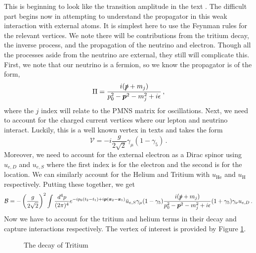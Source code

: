 \documentclass[10pt]{article}
\begin{document}
This is beginning to look like the transition amplitude in the text \cite{Akhmedov_2008}. The difficult part begins now in attempting to understand the propagator in this weak interaction with external atoms. It is simplest here to use the Feynman rules for the relevant vertices. We note there will be contributions from the tritium decay, the inverse process, and the propagation of the neutrino and electron. Though all the processes aside from the neutrino are external, they still will complicate this. First, we note that our neutrino is a fermion, so we know the propagator is of the form,
\begin{equation}
  \Pi = \frac{i(\slashed{p} + m_j)}{p_{0}^{2}-\bm{p}^{2} - m_{j}^{2} + i\epsilon}\, ,
\end{equation}
where the $j$ index will relate to the PMNS matrix for oscillations. Next, we need to account for the charged current vertices where our lepton and neutrino interact. Luckily, this is a well known vertex in texts \cite{ew_lec} and takes the form
\begin{equation}
  \mathcal{V} = -i\frac{g}{2\sqrt{2}}\gamma_{\mu}(1 - \gamma_{5}) \, .
\end{equation}
Moreover, we need to account for the external electron as a Dirac spinor using $u_{e,D}$ and $u_{e,S}$ where the first index is for the electron and the second is for the location. We can similarly account for the Helium and Tritium with $u_{\text{He}}$ and $u_{\text{H}}$ respectively. Putting these together, we get
\begin{equation}
  \mathcal{B} = -\left(\frac{g}{2\sqrt{2}}\right)^{2}\int \frac{d^{4}p}{(2\pi)^{4}}e^{-ip_{0}(t_{2} - t_{1}) + i\bm{p}(\bm{x}_{2} - \bm{x}_{1})}\bar{u}_{e,S}\gamma_{\mu}(1-\gamma_{5})\frac{i(\slashed{p} + m_j)}{p_{0}^{2}-\bm{p}^{2} - m_{j}^{2} + i\epsilon}(1 + \gamma_{5})\gamma_{\nu}u_{e,D} \, .
\end{equation}
Now we have to account for the tritium and helium terms in their decay and capture interactions respectively. The vertex of interest is provided by Figure \ref{fig:decay}.

\begin{figure}[h]
  \centering
  \caption{The decay of Tritium}
  \label{fig:decay}
\end{figure}
\end{document}
